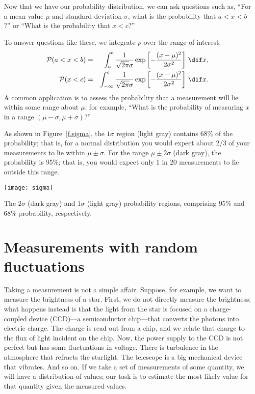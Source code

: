 Now that we have our probability distribution, we can ask questions such as, ``For a mean value $\mu$ and standard deviation $\sigma$, what is the probability that $a < x < b$?'' or ``What is the probability that $x < c$?''

To answer questions like these, we integrate $p$ over the range of interest:
\begin{eqnarray*}
	\prob(a< x < b) &=& \int_{a}^{b} \frac{1}{\sqrt{2\pi}\sigma}\exp\left[-\frac{(x-\mu)^{2}}{2\sigma^{2}}\right]\,\dif x,\\
	\prob(x < c) &=& \int_{-\infty}^{c} \frac{1}{\sqrt{2\pi}\sigma}\exp\left[-\frac{(x-\mu)^{2}}{2\sigma^{2}}\right]\,\dif x.
\end{eqnarray*}
A common application is to assess the probability that a measurement will lie within some range about $\mu$: for example, ``What is the probability of measuring $x$ in a range $(\mu-\sigma,\mu+\sigma)$?'' 

As shown in Figure~\ref{f.sigma}, the $1\sigma$ region (light gray) contains 68\% of the probability; that is, for a normal distribution you would expect about 2/3 of your measurements to lie within $\mu \pm \sigma$.  For the range $\mu \pm 2\sigma$ (dark gray), the probability is 95\%; that is, you would expect only 1 in 20 measurements to lie outside this range.

\begin{marginfigure}
\texttt{[image: sigma]}
\caption[Proability regions for one and two standard deviations]{The $2\sigma$ (dark gray) and $1\sigma$ (light gray) probability regions, comprising 95\% and 68\% probability, respectively.}
\label{f.sigma}
\end{marginfigure}


\section{Measurements with random fluctuations}

Taking a measurement is not a simple affair.  Suppose, for example, we want to measure the brightness of a star.  First, we do not directly measure the brightness; what happens instead is that the light from the star is focused on a charge-coupled device (CCD)---a semiconductor chip---that converts the photons into electric charge.  The charge is read out from a chip, and we relate that charge to the flux of light incident on the chip.  Now, the power supply to the CCD is not perfect but has some fluctuations in voltage.  There is turbulence in the atmosphere that refracts the starlight. The telescope is a big mechanical device that vibrates. And so on. If we take a set of measurements of some quantity, we will have a distribution of values; our task is to estimate the most likely value for that quantity given the measured values.

